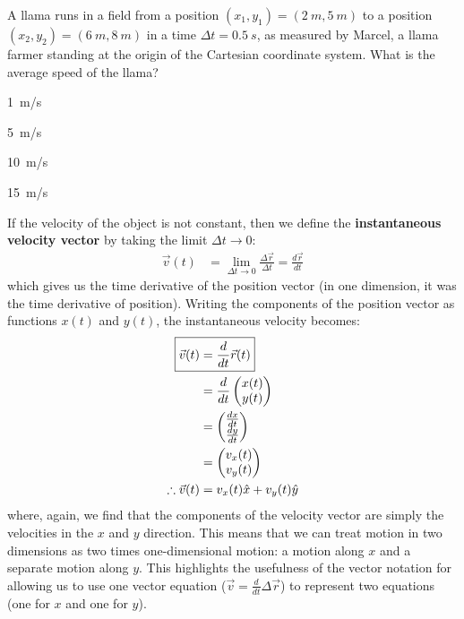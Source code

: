 \begin{checkpoint}\label{cp:describingmotioninnd:llama}
\begin{MCquestion}{A llama runs in a field from a position $(x_1,y_1)=(\SI{2}{m},\SI{5}{m})$ to a position $(x_2,y_2)=(\SI{6}{m},\SI{8}{m})$ in a time $\Delta t=\SI{0.5}{s}$, as measured by Marcel, a llama farmer standing at the origin of the Cartesian coordinate system. What is the average speed of the llama?}
\item \SI{1}{m/s}
\item \SI{5}{m/s}
\item \SI{10}{m/s} \correct
\item \SI{15}{m/s}
\end{MCquestion}
\end{checkpoint}

If the velocity of the object is not constant, then we define the \textbf{instantaneous velocity vector} by taking the limit $\Delta t\to 0$:
\begin{align}
\vec v(t) &= \lim_{\Delta t \to 0}\frac{\Delta \vec r}{\Delta t}=\frac{d\vec r}{dt}
\end{align}
which gives us the time derivative of the position vector (in one dimension, it was the time derivative of position). Writing the components of the position vector as functions $x(t)$ and $y(t)$, the instantaneous velocity becomes:
\begin{align}
\label{eqn:describingmotioninnd:vvecdef}
\Aboxed{\vec v(t) &=\frac{d}{dt}\vec r(t) }\\
&=\frac{d}{dt} \begin{pmatrix}
           x(t) \\
           y(t) \\
         \end{pmatrix}\nonumber\\ 
&=\begin{pmatrix}
           \frac{dx}{dt}  \\
          \frac{dy}{dt}  \\
         \end{pmatrix}\nonumber\\ 
 &=\begin{pmatrix}
           v_x(t) \\
           v_y(t) \\
         \end{pmatrix}\nonumber\\   
\therefore \vec v(t) &= v_x(t)\hat x+v_y(t)\hat y  \nonumber     
\end{align}
where, again, we find that the components of the velocity vector are simply the velocities in the $x$ and $y$ direction. This means that we can treat motion in two dimensions as two times one-dimensional motion: a motion along $x$ and a separate motion along $y$. This highlights the usefulness of the vector notation for allowing us to use one vector equation ($\vec v=\frac{d}{dt}\Delta \vec r$) to represent two equations (one for $x$ and one for $y$). 

